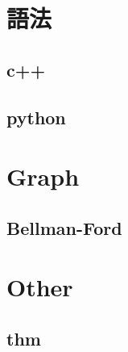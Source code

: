 \section{語法}
    \subsection{c++}
        
    \subsection{python}
        

\section{Graph}
    \subsection{Bellman-Ford}
        

\section{Other}
    \subsection{thm}
